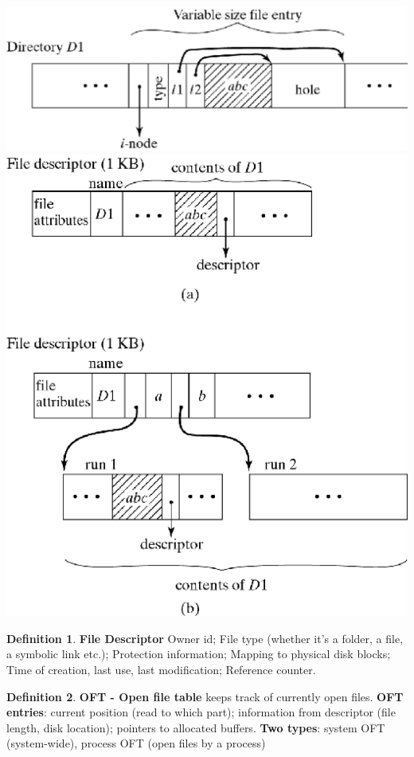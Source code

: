 \documentclass[11pt,a4paper]{article}
\theoremstyle{definition}
\newtheorem{definition}{Definition}[section]
\begin{document}
	\begin{minipage}{0.5\linewidth}
		\includegraphics[width=0.8\linewidth ]{m2/implementDirectory}
		\includegraphics[width=0.8\linewidth ]{m2/entryOrganization}
	\end{minipage}
	
\begin{definition}{\textbf{File Descriptor}}
	Owner id; File type (whether it's a folder, a file, a symbolic link etc.); Protection information; Mapping to physical disk blocks; Time of creation, last use, last modification; Reference counter.
\end{definition}

\begin{definition}{\textbf{OFT - Open file table}}
	keeps track of currently open files. \textbf{OFT entries}: current position (read to which part); information from descriptor (file length, disk location); pointers to allocated buffers. \textbf{Two types}: system OFT (system-wide), process OFT (open files by a process)
\end{definition}
\end{document}
